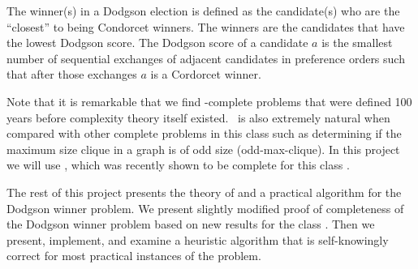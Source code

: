 The winner(s) in a Dodgson election is defined as the candidate(s) who are
the ``closest'' to being Condorcet winners.
The winners are the candidates that have the lowest Dodgson score.
The Dodgson score of a candidate $a$ is the smallest number of
sequential exchanges of adjacent candidates in preference orders such that
after those exchanges $a$ is a Cordorcet winner.

Note that it is remarkable that we find \tp-complete problems that were defined
100 years before complexity theory itself existed.
\dwin~is also extremely natural when compared with other complete
problems in this class such as determining if the maximum size clique in a
graph is of odd size (odd-max-clique).
In this project we will use ,
which was recently shown to be complete for this class \citep{compsat}.

The rest of this project presents the theory of and a practical algorithm for
the Dodgson winner problem.
We present slightly modified proof of completeness of
the Dodgson winner problem based on new results for the class \tp.
Then we present, implement, and examine a heuristic algorithm
that is self-knowingly correct for most practical instances of the problem.



